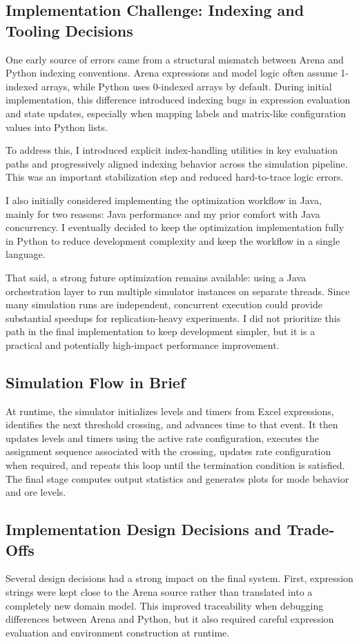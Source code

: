 \documentclass[11pt]{article}
\begin{document}
\subsection{Implementation Challenge: Indexing and Tooling Decisions}
One early source of errors came from a structural mismatch between Arena and Python indexing conventions. Arena expressions and model logic often assume 1-indexed arrays, while Python uses 0-indexed arrays by default. During initial implementation, this difference introduced indexing bugs in expression evaluation and state updates, especially when mapping labels and matrix-like configuration values into Python lists.

To address this, I introduced explicit index-handling utilities in key evaluation paths and progressively aligned indexing behavior across the simulation pipeline. This was an important stabilization step and reduced hard-to-trace logic errors.

I also initially considered implementing the optimization workflow in Java, mainly for two reasons: Java performance and my prior comfort with Java concurrency. I eventually decided to keep the optimization implementation fully in Python to reduce development complexity and keep the workflow in a single language.

That said, a strong future optimization remains available: using a Java orchestration layer to run multiple simulator instances on separate threads. Since many simulation runs are independent, concurrent execution could provide substantial speedups for replication-heavy experiments. I did not prioritize this path in the final implementation to keep development simpler, but it is a practical and potentially high-impact performance improvement.


\subsection{Simulation Flow in Brief}
At runtime, the simulator initializes levels and timers from Excel expressions, identifies the next threshold crossing, and advances time to that event. It then updates levels and timers using the active rate configuration, executes the assignment sequence associated with the crossing, updates rate configuration when required, and repeats this loop until the termination condition is satisfied. The final stage computes output statistics and generates plots for mode behavior and ore levels.

\subsection{Implementation Design Decisions and Trade-Offs}
Several design decisions had a strong impact on the final system. First, expression strings were kept close to the Arena source rather than translated into a completely new domain model. This improved traceability when debugging differences between Arena and Python, but it also required careful expression evaluation and environment construction at runtime.
\end{document}
